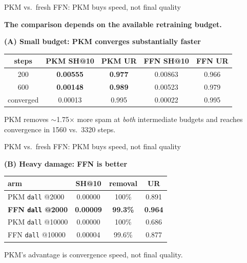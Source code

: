 \documentclass{beamer}
\begin{document}
\begin{frame}{PKM vs.\ fresh FFN: PKM buys speed, not final quality}

\textbf{The comparison depends on the available retraining budget.}

\medskip
\textbf{(A) Small budget: PKM converges substantially faster}

\begin{center}
\begin{tabular}{|c|c|c|c|c|}
\hline
steps & PKM SH@10 & PKM UR & FFN SH@10 & FFN UR \\
\hline
200 & \textbf{0.00555} & \textbf{0.977} & 0.00863 & 0.966 \\
600 & \textbf{0.00148} & \textbf{0.989} & 0.00523 & 0.979 \\
\hline
converged &
0.00013 & 0.995 &
0.00022 & 0.995 \\
\hline
\end{tabular}
\end{center}

PKM removes $\sim$1.75$\times$ more spam at \emph{both} intermediate
budgets and reaches convergence in 1560 vs.\ 3320 steps.


\end{frame}


\begin{frame}{PKM vs.\ fresh FFN: PKM buys speed, not final quality}

\textbf{(B) Heavy damage: FFN is better}

\begin{center}
\begin{tabular}{|l|c|c|c|}
\hline
arm & SH@10 & removal & UR \\
\hline
PKM \texttt{dall} @2000 & 0.00000 & 100\% & 0.891 \\
\textbf{FFN \texttt{dall} @2000} & \textbf{0.00009} & \textbf{99.3\%} & \textbf{0.964} \\
PKM \texttt{dall} @10000 & 0.00000 & 100\% & 0.686 \\
FFN \texttt{dall} @10000 & 0.00004 & 99.6\% & 0.877 \\
\hline
\end{tabular}
\end{center}

\alert{PKM's advantage is convergence speed, not final quality.}

\end{frame}
\end{document}
